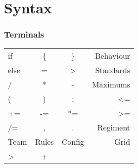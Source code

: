 \section{Syntax}
	\subsubsection{Terminals}
		
		\begin{tabular}{ l c c r}
			if   & \{ 	 & \} 	  & Behaviour  \\
		  	else &  = 	 & >  	  & Standards  \\
		 	/ 	 & *  	 & -  	  & Maximums   \\
		 	( 	 & )  	 & ;  	  & <=		   \\
		 	+= 	 & -=    & *= 	  & >=		   \\
		 	/= 	 & ,     & .  	  & Regiment   \\
			Team & Rules & Config & Grid	   \\
			>	 &   + 	 &		  &			   \\
		\end{tabular}
